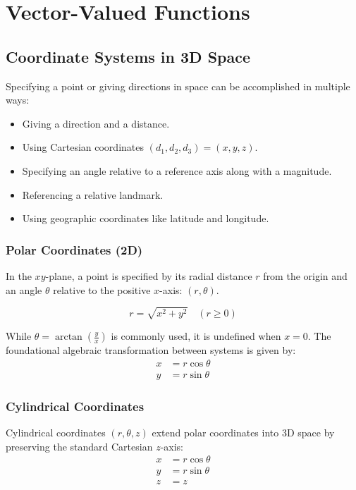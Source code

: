 \section{Vector-Valued Functions}

\subsection{Coordinate Systems in 3D Space}

Specifying a point or giving directions in space can be accomplished in multiple ways:
\begin{itemize}
    \item Giving a direction and a distance.
    \item Using Cartesian coordinates $(d_1, d_2, d_3) = (x, y, z)$.
    \item Specifying an angle relative to a reference axis along with a magnitude.
    \item Referencing a relative landmark.
    \item Using geographic coordinates like latitude and longitude.
\end{itemize}

\subsubsection{Polar Coordinates (2D)}
In the $xy$-plane, a point is specified by its radial distance $r$ from the origin and an angle $\theta$ relative to the positive $x$-axis: $(r, \theta)$.

\[
r = \sqrt{x^2 + y^2} \quad (r \ge 0)
\]

While $\theta = \arctan\left(\frac{y}{x}\right)$ is commonly used, it is undefined when $x = 0$. The foundational algebraic transformation between systems is given by:
\begin{align*}
x &= r\cos\theta \\
y &= r\sin\theta
\end{align*}


\subsubsection{Cylindrical Coordinates}
Cylindrical coordinates $(r, \theta, z)$ extend polar coordinates into 3D space by preserving the standard Cartesian $z$-axis:
\begin{align*}
x &= r\cos\theta \\
y &= r\sin\theta \\
z &= z
\end{align*}

